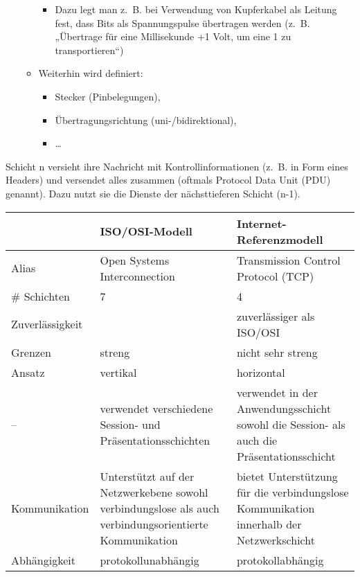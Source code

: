 \begin{itemize}
\begin{itemize}
        \begin{itemize}
            \item Dazu legt man z.\ B. bei Verwendung von Kupferkabel als Leitung fest, dass Bits als Spannungspulse übertragen werden (z.\ B. „Übertrage für eine Millisekunde +1 Volt, um eine 1 zu transportieren“)
        \end{itemize}
        \item Weiterhin wird definiert:
        \begin{itemize}
            \item Stecker (Pinbelegungen),
            \item Übertragungsrichtung (uni-/bidirektional),
            \item \ldots
        \end{itemize}
    \end{itemize}
\end{itemize}

Schicht n versieht ihre Nachricht mit Kontrollinformationen (z.\ B. in Form eines Headers) und versendet alles zusammen (oftmals Protocol Data Unit (PDU) genannt).
Dazu nutzt sie die Dienste der nächsttieferen Schicht (n-1).

\bigbreak
\begin{center}
    \begin{tabularx}{\textwidth}{|X|X|X|}
        \hline
        & ISO/OSI-Modell & Internet-Referenzmodell \tabularnewline
        \hline
        Alias & Open Systems Interconnection & Transmission Control Protocol (TCP) \tabularnewline
        \hline
        \# Schichten & 7 & 4 \tabularnewline
        \hline
        Zuverlässigkeit & & zuverlässiger als ISO/OSI \tabularnewline
        \hline
        Grenzen & streng & nicht sehr streng \tabularnewline
        \hline
        Ansatz & vertikal & horizontal \tabularnewline
        \hline
        – & verwendet verschiedene Session- und Präsentationsschichten & verwendet in der Anwendungsschicht sowohl die Session- als auch die Präsentationsschicht \tabularnewline
        \hline
        Kommunikation & Unterstützt auf der Netzwerkebene sowohl verbindungslose als auch verbindungsorientierte Kommunikation & bietet Unterstützung für die verbindungslose Kommunikation innerhalb der Netzwerkschicht \tabularnewline
        \hline
        Abhängigkeit & protokollunabhängig & protokollabhängig \tabularnewline
        \hline
    \end{tabularx}
\end{center}

